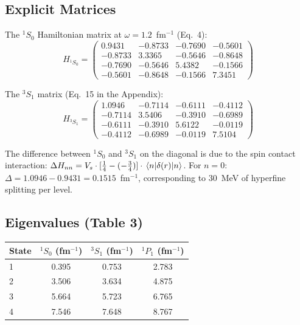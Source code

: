 \documentclass[11pt,a4paper]{article}
\begin{document}
\subsection{Explicit Matrices}

The ${}^1S_0$ Hamiltonian matrix at $\omega = 1.2$~fm$^{-1}$ (Eq.~4):
\begin{equation}
  H_{{}^1S_0} = \begin{pmatrix}
    0.9431 & -0.8733 & -0.7690 & -0.5601 \\
    -0.8733 & 3.3365 & -0.5646 & -0.8648 \\
    -0.7690 & -0.5646 & 5.4382 & -0.1566 \\
    -0.5601 & -0.8648 & -0.1566 & 7.3451
  \end{pmatrix}
  \label{eq:h1s0}
\end{equation}

The ${}^3S_1$ matrix (Eq.~15 in the Appendix):
\begin{equation}
  H_{{}^3S_1} = \begin{pmatrix}
    1.0946 & -0.7114 & -0.6111 & -0.4112 \\
    -0.7114 & 3.5406 & -0.3910 & -0.6989 \\
    -0.6111 & -0.3910 & 5.6122 & -0.0119 \\
    -0.4112 & -0.6989 & -0.0119 & 7.5104
  \end{pmatrix}
  \label{eq:h3s1}
\end{equation}

The difference between ${}^1S_0$ and ${}^3S_1$ on the diagonal is due to the spin contact interaction: $\Delta H_{nn} = V_s \cdot [\tfrac{1}{4} - (-\tfrac{3}{4})] \cdot \mel{n}{\delta(r)}{n}$. For $n=0$: $\Delta = 1.0946 - 0.9431 = 0.1515$~fm$^{-1}$, corresponding to 30~MeV of hyperfine splitting per level.

\subsection{Eigenvalues (Table 3)}

\begin{center}
\begin{tabular}{l c c c}
\toprule
State & ${}^1S_0$ (fm$^{-1}$) & ${}^3S_1$ (fm$^{-1}$) & ${}^1P_1$ (fm$^{-1}$) \\
\midrule
1 & 0.395 & 0.753 & 2.783 \\
2 & 3.506 & 3.634 & 4.875 \\
3 & 5.664 & 5.723 & 6.765 \\
4 & 7.546 & 7.648 & 8.767 \\
\bottomrule
\end{tabular}
\end{center}
\end{document}

